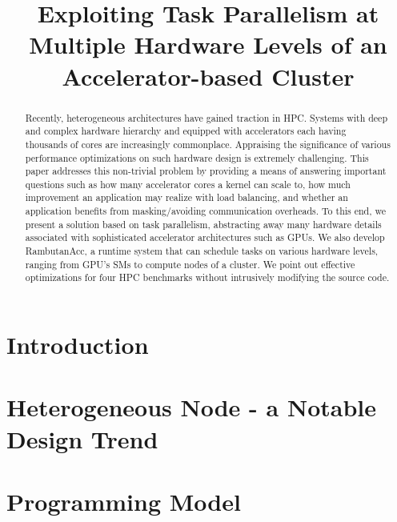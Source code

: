 \documentclass[sigconf]{acmart}
\begin{document}
\title{Exploiting Task Parallelism at Multiple Hardware Levels of an Accelerator-based Cluster}


\begin{abstract}
Recently, heterogeneous architectures have gained traction in HPC. Systems with deep and complex hardware hierarchy and equipped with accelerators each having thousands of cores are increasingly commonplace. Appraising the significance of various performance optimizations on such hardware design is extremely challenging. This paper addresses this non-trivial problem by providing a means of answering important questions such as how many accelerator cores a kernel can scale to, how much improvement an application may realize with load balancing, and whether an application benefits from masking/avoiding communication overheads. To this end, we present a solution based on task parallelism, abstracting away many hardware details associated with sophisticated accelerator architectures such as GPUs. We also develop RambutanAcc, a runtime system that can schedule tasks on various hardware levels, ranging from GPU's SMs to compute nodes of a cluster. We point out effective optimizations for four HPC benchmarks without intrusively modifying the source code.
\end{abstract}

\maketitle

\section{Introduction}
\label{sec:intro}


\section{Heterogeneous Node - a Notable Design Trend}
\label{sec:motivation}


\section{Programming Model}
\label{sec:model}

\end{document}
